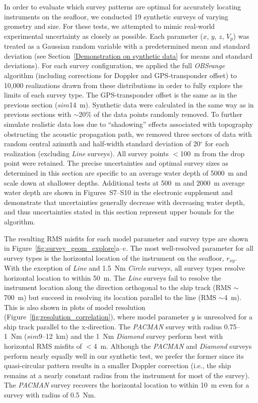 In order to evaluate which survey patterns are optimal for accurately locating instruments on the seafloor, we conducted 19 synthetic surveys of varying geometry and size. For these tests, we attempted to mimic real-world experimental uncertainty as closely as possible. Each parameter ($x$, $y$, $z$, $V_p$) was treated as a Gaussian random variable with a predetermined mean and standard deviation (see Section~\ref{Demonstration on synthetic data} for means and standard deviations). For each survey configuration, we applied the full \textit{OBSrange} algorithm (including corrections for Doppler and GPS-transponder offset) to 10,000 realizations drawn from these distributions in order to fully explore the limits of each survey type. The GPS-transponder offset is the same as in the previous section ($sim$14~m). Synthetic data were calculated in the same way as in previous sections with $\sim$20\% of the data points randomly removed. To further simulate realistic data loss due to ``shadowing'' effects associated with topography obstructing the acoustic propagation path, we removed three sectors of data with random central azimuth and half-width standard deviation of 20$^{\circ}$ for each realization (excluding \textit{Line} surveys). All survey points $<$100~m from the drop point were retained. The precise uncertainties and optimal survey sizes as determined in this section are specific to an average water depth of 5000~m and scale down at shallower depths. Additional tests at 500~m and 2000~m average water depth are shown in Figures~S7--S10 in the electronic supplement and demonstrate that uncertainties generally decrease with decreasing water depth, and thus uncertainties stated in this section represent upper bounds for the algorithm.

The resulting RMS misfits for each model parameter and survey type are shown in Figure~\ref{fig:survey_geom_explore}a--c. The most well-resolved parameter for all survey types is the horizontal location of the instrument on the seafloor, $r_{xy}$. With the exception of \textit{Line} and 1.5~Nm \textit{Circle} surveys, all survey types resolve horizontal location to within 50~m. The \textit{Line} surveys fail to resolve the instrument location along the direction orthogonal to the ship track (RMS $\sim$700~m) but succeed in resolving its location parallel to the line (RMS $\sim$4~m). This is also shown in plots of model resolution (Figure~\ref{fig:resolution_correlation}), where model parameter $y$ is unresolved for a ship track parallel to the x-direction. The \textit{PACMAN} survey with radius 0.75--1~Nm ($sim$9--12~km) and the 1~Nm \textit{Diamond} survey perform best with horizontal RMS misfits of $<$4~m. Although the \textit{PACMAN} and \textit{Diamond} surveys perform nearly equally well in our synthetic test, we prefer the former since its quasi-circular pattern results in a smaller Doppler correction (i.e., the ship remains at a nearly constant radius from the instrument for most of the survey). The \textit{PACMAN} survey recovers the horizontal location to within 10~m even for a survey with radius of 0.5~Nm.

